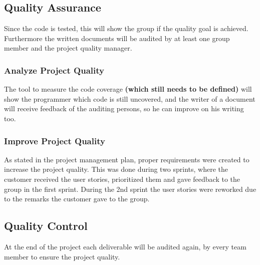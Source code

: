 \subsection{Quality Assurance}
Since the code is tested, this will show the group if the quality goal is achieved. Furthermore the written documents will be audited by at least one group member and the project quality manager.
\subsubsection{Analyze Project Quality}
The tool to measure the code coverage \textbf{(which still needs to be defined)} will show the programmer which code is still uncovered, and the writer of a document will receive feedback of the auditing persons, so he can improve on his writing too.
\subsubsection{Improve Project Quality}
As stated in the project management plan, proper requirements were created to increase the project quality. This was done during two sprints, where the customer received the user stories, prioritized them and gave feedback to the group in the first sprint. During the 2nd sprint the user stories were reworked due to the remarks the customer gave to the group.
\subsection{Quality Control}
At the end of the project each deliverable will be audited again, by every team member to ensure the project quality.
